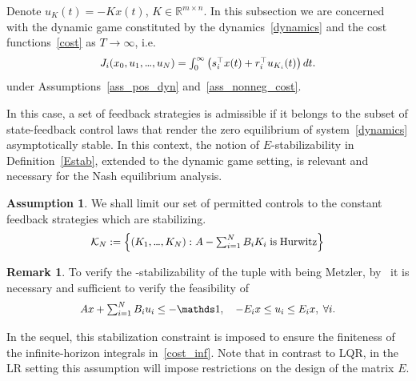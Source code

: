 \documentclass[letterpaper, 10 pt, conference]{ieeeconf}
\newcommand\mydots{\hbox to 0.7em{.\hss.\hss.}}
\theoremstyle{definition}
\newtheorem{ass}{Assumption}
\newtheorem{rem}{Remark}
\begin{document}
Denote $u_{K}(t)=-Kx(t)$, $K\in \mathbb R^{m\times n}$.
In this subsection we are concerned with the dynamic game constituted by the dynamics~\eqref{dynamics} and the cost functions~\eqref{cost} as $T\rightarrow \infty$, i.e.
\begin{align}\label{cost_inf}
    \scalebox{.95}{$J_i(x_0, u_1,\mydots, u_N)
= \int_0^{\infty} \left( s_i^{\top}x(t)+ r_i^{\top} u_{K_i}(t) \right) dt$}.
\end{align}
under Assumptions~\ref{ass_pos_dyn} and~\ref{ass_nonneg_cost}. 

In this case, a set of feedback strategies is admissible if it belongs to the subset of state-feedback control laws that render the zero equilibrium of system~\eqref{dynamics} asymptotically stable. In this context, the notion of $E$-stabilizability in Definition~\ref{Estab}, extended to the dynamic game setting, is relevant and necessary for the Nash equilibrium analysis.
\begin{ass}
    We shall limit our set of permitted controls to the constant feedback strategies which are stabilizing. \begin{align}\label{stab_set}
    \scalebox{.94}{$\mathcal K_N:= \Big\{ (K_1,\mydots , K_N): \hspace{0.1mm} A-\textstyle\sum\nolimits_{i=1}^NB_iK_i \hspace{1mm} \text{is} \hspace{1mm}\text{Hurwitz}
    \Big\}$}
\end{align}
\end{ass}
\begin{rem}\label{stblrem}
To verify the \scalebox{.94}{$(E_1,\mydots, E_N)$}-stabilizability of the tuple \scalebox{.94}{$(A,B_1,\mydots, B_N)$} with  being Metzler, by~\cite[Lem. 4]{LR_paperII} it is necessary and sufficient to verify the feasibility of
\begin{align*}
         \scalebox{.94}{$Ax + \textstyle\sum\nolimits_{i=1}^NB_i u_i \le - \mathds 1, \quad -E_ix \le u_i \le E_ix, \hspace{1mm} \forall i.$}%
\end{align*}
\end{rem}
In the sequel, this stabilization constraint is imposed to ensure the finiteness of the infinite-horizon integrals in~\eqref{cost_inf}. Note that in contrast to LQR, in the LR setting this assumption will impose restrictions on the design of the matrix $E$. 
\end{document}
